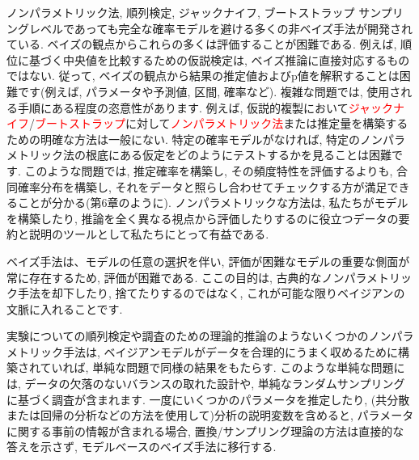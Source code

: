 \documentclass[10pt,dvipdfmx,a4]{beamer}
\newcommand{\tcr}[1]{\textcolor{red}{#1}}
\begin{document}

\begin{frame}{ノンパラメトリック法, 順列検定, ジャックナイフ, ブートストラップ}
サンプリングレベルであっても完全な確率モデルを避ける多くの非ベイズ手法が開発されている.
ベイズの観点からこれらの多くは評価することが困難である.
例えば, 順位に基づく中央値を比較するための仮説検定は, ベイズ推論に直接対応するものではない.
従って, ベイズの観点から結果の推定値およびp値を解釈することは困難です(例えば, パラメータや予測値, 区間, 確率など).
複雑な問題では, 使用される手順にある程度の恣意性があります.
例えば, 仮説的複製において\tcr{ジャックナイフ}/\tcr{ブートストラップ}に対して\tcr{ノンパラメトリック法}または推定量を構築するための明確な方法は一般にない.
特定の確率モデルがなければ, 特定のノンパラメトリック法の根底にある仮定をどのようにテストするかを見ることは困難です.
このような問題では, 推定確率を構築し, その頻度特性を評価するよりも, 合同確率分布を構築し, それをデータと照らし合わせてチェックする方が満足できることが分かる(第6章のように).
ノンパラメトリックな方法は, 私たちがモデルを構築したり, 推論を全く異なる視点から評価したりするのに役立つデータの要約と説明のツールとして私たちにとって有益である.
\end{frame}


\begin{frame}
ベイズ手法は、モデルの任意の選択を伴い, 評価が困難なモデルの重要な側面が常に存在するため, 評価が困難である.
ここの目的は, 古典的なノンパラメトリック手法を却下したり, 捨てたりするのではなく, これが可能な限りベイジアンの文脈に入れることです.

実験についての順列検定や調査のための理論的推論のようないくつかのノンパラメトリック手法は, ベイジアンモデルがデータを合理的にうまく収めるために構築されていれば, 単純な問題で同様の結果をもたらす.
このような単純な問題には, データの欠落のないバランスの取れた設計や, 単純なランダムサンプリングに基づく調査が含まれます.
一度にいくつかのパラメータを推定したり, (共分散または回帰の分析などの方法を使用して)分析の説明変数を含めると, パラメータに関する事前の情報が含まれる場合, 置換/サンプリング理論の方法は直接的な答えを示さず, モデルベースのベイズ手法に移行する.
\end{frame}

\end{document}
